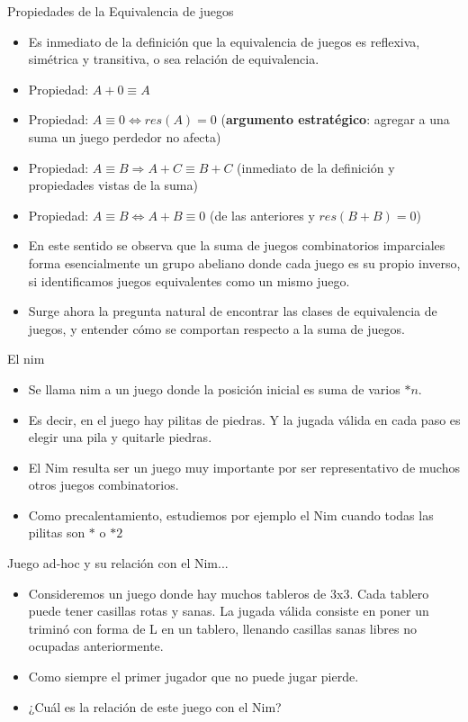 \documentclass{beamer}
\begin{document}
\begin{frame}{Propiedades de la Equivalencia de juegos}
    \begin{itemize}
        \item Es inmediato de la definición que la equivalencia de juegos es reflexiva, simétrica y transitiva, o sea relación de equivalencia.
        \item Propiedad: $A+0 \equiv A$
        \item Propiedad: $A \equiv 0 \Leftrightarrow res(A) = 0$ (\textbf{argumento estratégico}: agregar a una suma un juego perdedor no afecta)
        \item Propiedad: $A \equiv B \Rightarrow A+C \equiv B+C$ (inmediato de la definición y propiedades vistas de la suma)
        \item Propiedad: $A \equiv B \Leftrightarrow A + B \equiv 0$ (de las anteriores y $res(B+B) = 0$)
        \item En este sentido se observa que la suma de juegos combinatorios imparciales forma esencialmente un grupo abeliano
        donde cada juego es su propio inverso, si identificamos juegos equivalentes como un mismo juego.
        \item Surge ahora la pregunta natural de encontrar las clases de equivalencia de juegos, y entender cómo se comportan
        respecto a la suma de juegos.
    \end{itemize}
\end{frame}

\begin{frame}{El nim}
    \begin{itemize}
        \item Se llama nim a un juego donde la posición inicial es suma de varios $*n$.
        \item Es decir, en el juego hay pilitas de piedras. Y la jugada válida en cada paso es elegir una pila y quitarle piedras.
        \item El Nim resulta ser un juego muy importante por ser representativo de muchos otros juegos combinatorios.
        \item Como precalentamiento, estudiemos por ejemplo el Nim cuando todas las pilitas son $*$ o $*2$
    \end{itemize}
\end{frame}

\begin{frame}{Juego ad-hoc y su relación con el Nim...}
    \begin{itemize}
        \item Consideremos un juego donde hay muchos tableros de 3x3. Cada tablero puede tener casillas rotas y sanas. La jugada
        válida consiste en poner un triminó con forma de L en un tablero, llenando casillas sanas libres no ocupadas anteriormente.
        \item Como siempre el primer jugador que no puede jugar pierde.
        \item ¿Cuál es la relación de este juego con el Nim?
    \end{itemize}
\end{frame}
\end{document}
